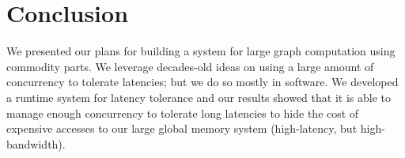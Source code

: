 \documentclass[10pt,nocopyrightspace,preprint]{sigplanconf}
\begin{document}
\section{Conclusion}
\label{sec:conclusion}

We presented our plans for building a system for large graph
computation using commodity parts. We leverage decades-old ideas on
using a large amount of concurrency to tolerate latencies; but we do so
mostly in software. We developed a runtime system for latency
tolerance and our results showed that it is able to manage enough
concurrency to tolerate long latencies to hide the cost of
expensive accesses to our large global memory system (high-latency,
but high-bandwidth).



\end{document}
